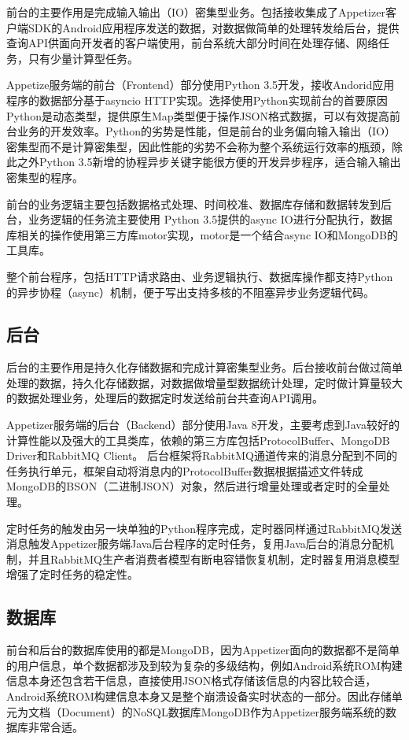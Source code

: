 前台的主要作用是完成输入输出（IO）密集型业务。包括接收集成了Appetizer客户端SDK的Android应用程序发送的数据，对数据做简单的处理转发给后台，提供查询API供面向开发者的客户端使用，前台系统大部分时间在处理存储、网络任务，只有少量计算型任务。

Appetize服务端的前台（Frontend）部分使用Python 3.5开发，接收Andorid应用程序的数据部分基于asyncio HTTP实现。选择使用Python实现前台的首要原因Python是动态类型，提供原生Map类型便于操作JSON格式数据，可以有效提高前台业务的开发效率。Python的劣势是性能，但是前台的业务偏向输入输出（IO）密集型而不是计算密集型，因此性能的劣势不会称为整个系统运行效率的瓶颈，除此之外Python 3.5新增的协程异步关键字能很方便的开发异步程序，适合输入输出密集型的程序。

前台的业务逻辑主要包括数据格式处理、时间校准、数据库存储和数据转发到后台，业务逻辑的任务流主要使用 Python 3.5提供的async IO进行分配执行，数据库相关的操作使用第三方库motor实现，motor是一个结合async IO和MongoDB的工具库。

整个前台程序，包括HTTP请求路由、业务逻辑执行、数据库操作都支持Python的异步协程（async）机制，便于写出支持多核的不阻塞异步业务逻辑代码。

\subsection{后台}
\label{subsec:serverBackend}

后台的主要作用是持久化存储数据和完成计算密集型业务。后台接收前台做过简单处理的数据，持久化存储数据，对数据做增量型数据统计处理，定时做计算量较大的数据处理业务，处理后的数据定时发送给前台共查询API调用。

Appetizer服务端的后台（Backend）部分使用Java 8开发，主要考虑到Java较好的计算性能以及强大的工具类库，依赖的第三方库包括ProtocolBuffer、MongoDB Driver和RabbitMQ Client。
后台框架将RabbitMQ通道传来的消息分配到不同的任务执行单元，框架自动将消息内的ProtocolBuffer数据根据描述文件转成MongoDB的BSON（二进制JSON）对象，然后进行增量处理或者定时的全量处理。

定时任务的触发由另一块单独的Python程序完成，定时器同样通过RabbitMQ发送消息触发Appetizer服务端Java后台程序的定时任务，复用Java后台的消息分配机制，并且RabbitMQ生产者消费者模型有断电容错恢复机制，定时器复用消息模型增强了定时任务的稳定性。

\subsection{数据库}
\label{subsec:database}

前台和后台的数据库使用的都是MongoDB，因为Appetizer面向的数据都不是简单的用户信息，单个数据都涉及到较为复杂的多级结构，例如Android系统ROM构建信息本身还包含若干信息，直接使用JSON格式存储该信息的内容比较合适，Android系统ROM构建信息本身又是整个崩溃设备实时状态的一部分。因此存储单元为文档（Document）的NoSQL数据库MongoDB作为Appetizer服务端系统的数据库非常合适。

